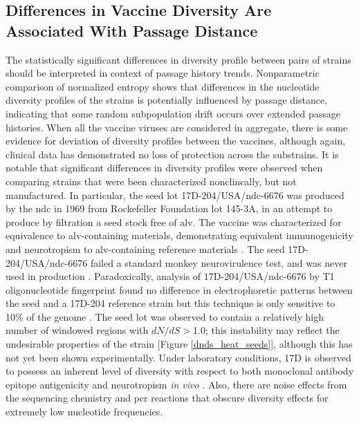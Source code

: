 	\subsection{Differences in Vaccine Diversity Are Associated With Passage Distance}
The statistically significant differences in diversity profile between pairs of strains should be interpreted in context of passage history trends. Nonparametric comparison of normalized entropy shows that differences in the nucleotide diversity profiles of the strains is potentially influenced by passage distance, indicating that some random subpopulation drift occurs over extended passage histories. When all the vaccine viruses are considered in aggregate, there is some evidence for deviation of diversity profiles between the vaccines, although again, clinical data has demonstrated no loss of protection across the substrains. It is notable that significant differences in diversity profiles were observed when comparing strains that were been characterized nonclincally, but not manufactured. In particular, the seed lot 17D-204/USA/\gls{ndc}-6676 was produced by the \gls{ndc} in 1969 from Rockefeller Foundation lot 145-3A, in an attempt to produce by filtration a seed stock free of \gls{alv}. The vaccine was characterized for equivalence to \gls{alv}-containing materials, demonstrating equivalent immunogenicity and neurotropism to \gls{alv}-containing reference materials \parencite{Tauraso:1968vg,Tauraso:1972vx}. The seed 17D-204/USA/\gls{ndc}-6676 failed a standard monkey neurovirulence test, and was never used in production \parencite{Monath:1983uk}. Paradoxically, analysis of 17D-204/USA/\gls{ndc}-6676 by T1 oligonucleotide fingerprint found no difference in electrophoretic patterns between the seed and a 17D-204 reference strain but this technique is only sensitive to 10\% of the genome \parencite{Monath:1983uk}. The seed lot was observed to contain a relatively high number of windowed regions with $dN/dS>$1.0; this instability may reflect the undesirable properties of the strain [Figure \ref{dnds_heat_seeds}], although this has not yet been shown experimentally. Under laboratory conditions, 17D is observed to possess an inherent level of diversity with respect to both monoclonal antibody epitope antigenicity and neurotropism \emph{in vivo} \parencite{Gould:1989vu}. Also, there are noise effects from the sequencing chemistry and \gls{pcr} reactions that obscure diversity effects for extremely low nucleotide frequencies.  
